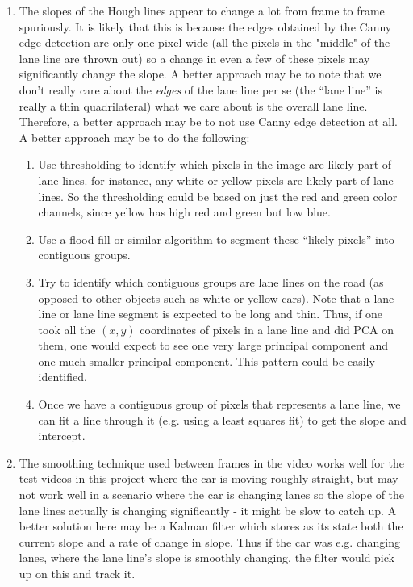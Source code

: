 \documentclass{article}
\begin{document}
\begin{enumerate}
\item The slopes of the Hough lines appear to change a lot from frame to frame spuriously. It is likely that this is because the edges obtained by the Canny edge detection are only one pixel wide (all the pixels in the "middle" of the lane line are thrown out) so a change in even a few of these pixels may significantly change the slope. A better approach may be to note that we don't really care about the \emph{edges} of the lane line per se (the ``lane line'' is really a thin quadrilateral) what we care about is the overall lane line. Therefore, a better approach may be to not use Canny edge detection at all. A better approach may be to do the following:
\begin{enumerate}
\item Use thresholding to identify which pixels in the image are likely part of lane lines. for instance, any white or yellow pixels are likely part of lane lines. So the thresholding could be based on just the red and green color channels, since yellow has high red and green but low blue.
\item Use a flood fill or similar algorithm to segment these ``likely pixels'' into contiguous groups.
\item Try to identify which contiguous groups are lane lines on the road (as opposed to other objects such as white or yellow cars). Note that a lane line or lane line segment is expected to be long and thin. Thus, if one took all the $(x,y)$ coordinates of pixels in a lane line and did PCA on them, one would expect to see one very large principal component and one much smaller principal component. This pattern could be easily identified.
\item Once we have a contiguous group of pixels that represents a lane line, we can fit a line through it (e.g. using a least squares fit) to get the slope and intercept.
\end{enumerate}
\item The smoothing technique used between frames in the video works well for the test videos in this project where the car is moving roughly straight, but may not work well in a scenario where the car is changing lanes so the slope of the lane lines actually is changing significantly - it might be slow to catch up. A better solution here may be a Kalman filter which stores as its state both the current slope and a rate of change in slope. Thus if the car was e.g. changing lanes, where the lane line's slope is smoothly changing, the filter would pick up on this and track it.

\end{enumerate}
\end{document}
